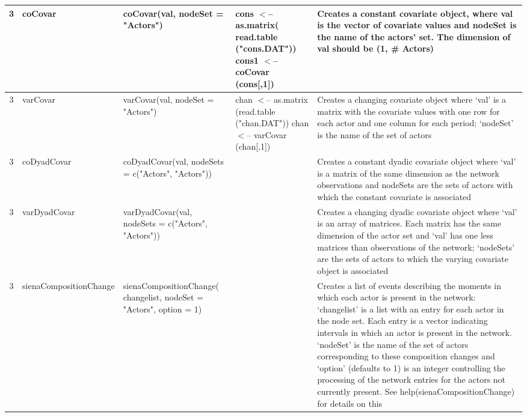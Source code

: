 \documentclass[a4paper,fleqn,11pt]{article}
\newcommand{\+}{\, + \,}
\begin{document}
\begin{landscape}
\begin{small}
\begin{longtable}{c | p{3.8cm} | p{4.5cm} | p{4.0cm} | p{7.4cm} }
3 &coCovar & coCovar(val, \newline
nodeSet = "Actors") & cons $<$-- \newline
as.matrix( read.table \newline
("cons.DAT")) \newline cons1 $<$--\newline
 coCovar (cons[,1]) & Creates a constant
covariate object, where val is the vector of covariate values and nodeSet is
the name of the actors' set.  The dimension of val should be (1, \#
Actors)\\
\hline

3 & varCovar & varCovar(val, \newline
nodeSet = "Actors") & chan $<$-- as.matrix \newline
(read.table ("chan.DAT")) \newline chan $<$-- \newline
varCovar (chan[,1]) & Creates a
changing covariate object where `val' is a matrix with the covariate values
with one row for each actor and one column for each period; `nodeSet' is the
name of the set of actors \\
\hline

3& coDyadCovar &coDyadCovar(val, \newline
nodeSets = \newline
c("Actors", "Actors")) & &
Creates a constant dyadic covariate object where `val' is a matrix of the
same dimension as the network observations and nodeSets are the sets of actors
with
which the constant covariate is associated\\
\hline

3 &varDyadCovar & varDyadCovar(val, \newline
nodeSets = \newline
c("Actors", "Actors")) &
&Creates a changing dyadic covariate object where `val' is an array of
matrices. Each matrix has the same dimension of the actor set and `val' has
one less matrices than observations of the network; `nodeSets' are the sets
of actors to which the varying covariate object is associated\\
\hline

3 & sienaCompositionChange &

sienaCompositionChange( changelist,\newline
nodeSet = "Actors", \newline
option = 1) & & Creates a list of events describing the moments
in which each actor is present in the network: `changelist' is a list with an
entry for each actor in the node set. Each entry is a vector indicating
intervals in which an actor is present in the network. `nodeSet' is the name
of the set of actors corresponding to these composition changes and `option'
(defaults to 1) is an integer controlling the processing of the network entries
for the actors not currently present. See help(sienaCompositionChange) for
details on this\\
\hline


\end{longtable}
\end{small}
\end{landscape}
\end{document}
